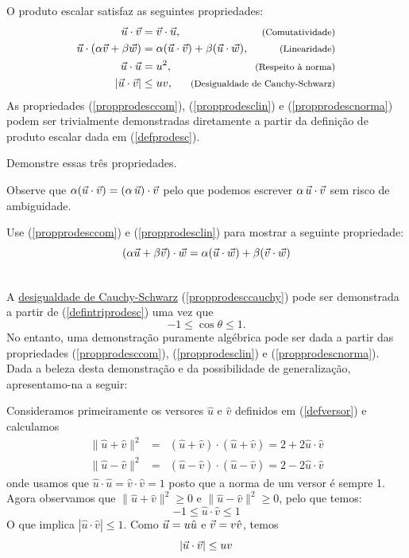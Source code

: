 O produto escalar satisfaz as seguintes propriedades:
\begin{subequations}\label{proprodesc}
\begin{align}
\vct{u}\cdot\vct{v}&=\vct{v}\cdot\vct{u},&\mytext{(Comutatividade)}\label{propprodesccom}\\
\vct{u}\cdot\left(\alpha\vct{v}+\beta \vct{w}\right)&=\alpha(\vct{u}\cdot\vct{v})+\beta(\vct{u}\cdot\vct{w}),\hspace{-5cm}&\mytext{(Linearidade)}\label{propprodesclin}\\
\vct{u}\cdot\vct{u}&=u^2,&\mytext{(Respeito à norma)}\label{propprodescnorma}\\
\left|\vct{u}\cdot\vct{v}\right|&\leq uv,&\mytext{(Desigualdade de Cauchy-Schwarz)}\label{propprodesccauchy}
\end{align}
\end{subequations}
As propriedades (\ref{propprodesccom}), (\ref{propprodesclin}) e (\ref{propprodescnorma}) podem ser trivialmente demonstradas diretamente a partir da definição de produto escalar dada em (\ref{defprodesc}).
\begin{exer} Demonstre essas três propriedades.
\end{exer}
Observe que $\alpha(\vec{u}\cdot\vec{v})=(\alpha~\!\vec{u})\cdot\vec{v}$ pelo que podemos escrever $\alpha~\!\vec{u}\cdot\vec{v}$ sem risco de ambiguidade.  
\begin{exer} Use (\ref{propprodesccom}) e  (\ref{propprodesclin}) para mostrar a seguinte propriedade:
$$
\left(\alpha\vec{u}+\beta \vec{v}\right)\cdot \vec{w}=\alpha (\vec{u}\cdot\vec{w})+ \beta (\vec{v}\cdot\vec{w})
$$

\end{exer}
~~ \\

A \underline{desigualdade de Cauchy-Schwarz} (\ref{propprodesccauchy}) pode ser demonstrada a partir de (\ref{defintriprodesc}) uma vez que $$-1\leq \cos\theta \leq 1.$$
No entanto, uma demonstração puramente algébrica pode ser dada a partir das propriedades (\ref{propprodesccom}), (\ref{propprodesclin}) e (\ref{propprodescnorma}). Dada a beleza desta demonstração e da possibilidade de generalização, apresentamo-na a seguir:

Consideramos primeiramente os versores $\hat{u}$ e $\hat{v}$ definidos em (\ref{defversor}) e calculamos
\begin{eqnarray*}
\|\hat{u}+\hat{v}\|^2 &=& \left(\hat{u}+\hat{v}\right)\cdot \left(\hat{u}+\hat{v}\right) = 2+2\hat{u}\cdot\hat{v} \\
\|\hat{u}-\hat{v}\|^2 &=& \left(\hat{u}-\hat{v}\right)\cdot \left(\hat{u}-\hat{v}\right) = 2-2\hat{u}\cdot\hat{v} 
\end{eqnarray*}
onde usamos que $\hat{u}\cdot\hat{u}=\hat{v}\cdot\hat{v}=1$ posto que a norma de um versor é sempre 1. Agora observamos que $\|\hat{u}+\hat{v}\|^2\geq 0 $ e $\|\hat{u}-\hat{v}\|^2\geq 0 $, pelo que temos:
$$-1\leq \hat{u}\cdot\hat{v} \leq 1$$
O que implica $|\hat{u}\cdot\hat{v}|\leq 1$. Como $\vec{u}=u\hat{u} $ e $\vec{v}=v\hat{v}$, temos
$$|\vec{u}\cdot\vec{v}|\leq uv$$ 

